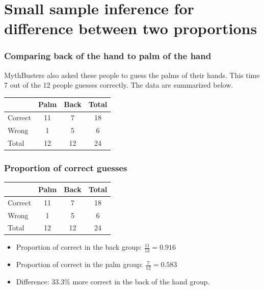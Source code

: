 \section{Small sample inference for difference between two proportions}


\begin{frame}
\frametitle{Comparing back of the hand to palm of the hand}

MythBusters also asked these people to guess the palms of their hands. This time 7 out of the 12 people guesses correctly. The data are summarized below.

\begin{center}
\begin{tabular}{ l | c | c | c }
          & Palm		& Back		& Total \\
\hline
Correct		& 11			& 7				& 18 \\
Wrong		  & 1				& 5				& 6 \\
\hline
Total			& 12			& 12			& 24 \\
\end{tabular}
\end{center}

\end{frame}


\begin{frame}
\frametitle{Proportion of correct guesses}

{\small
\begin{center}
\begin{tabular}{ l | c | c | c }
          & Palm  	& Back		& Total \\
\hline
Correct		& 11			& 7				& 18 \\
Wrong		  & 1				& 5				& 6 \\
\hline
Total			& 12			& 12			& 24 \\
\end{tabular}
\end{center}

}

\begin{itemize}

\item Proportion of correct in the back group: $\frac{11}{12} = 0.916$

\item Proportion of correct in the palm group: $\frac{7}{12} = 0.583$

\item Difference: 33.3\% more correct in the back of the hand group.

\end{itemize}


\end{frame}

